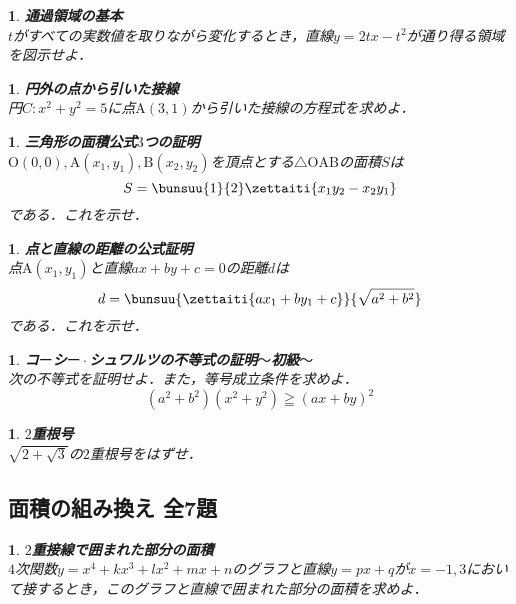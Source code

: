 \documentclass[10pt,
fleqn,
dvipdfmx,
uplatex
]{jsarticle}
\newtheorem{question}[Question]{}
\begin{document}
\begin{question}{\bf\boldmath 通過領域の基本}\\
$t$がすべての実数値を取りながら変化するとき，直線$y=2tx-t^2$が通り得る領域を図示せよ．
\end{question}



\begin{question}{\bf\boldmath 円外の点から引いた接線}\\
円$C:x^2+y^2=5$に点$\text{A}\left(3,1\right)$から引いた接線の方程式を求めよ．
\end{question}



\begin{question}{\bf\boldmath 三角形の面積公式$3$つの証明}\\
$\text{O}\left(0, 0\right), \text{A}\left(x_1, y_1\right), \text{B}\left(x_2, y_2\right)$を頂点とする$\triangle \text{OAB}$の面積$S$は
\[S=\bunsuu{1}{2}\zettaiti{x_1y_2-x_2y_1}\]
である．これを示せ．
\end{question}



\begin{question}{\bf\boldmath 点と直線の距離の公式証明}\\
点$\text{A}\left(x_1,y_1\right)$と直線$ax+by+c=0$の距離$d$は
\[d=\bunsuu{{\zettaiti{ax_1+by_1+c}}}{{\sqrt {a^2+b^2}}}\]
である．これを示せ．
\end{question}



\begin{question}{\bf\boldmath コ$ー$シ$ー\cdot$シュワルツの不等式の証明$〜$初級$〜$}\\
次の不等式を証明せよ．また，等号成立条件を求めよ．
\[\left(a^2+b^2\right)\left(x^2+y^2\right)\geqq \left(ax+by\right)^2\]
\end{question}



\begin{question}{\bf\boldmath $2$重根号}\\
$\sqrt {2+\sqrt 3}$の$2$重根号をはずせ．
\end{question}

\subsection{面積の組み換え 全7題}



\begin{question}{\bf\boldmath $2$重接線で囲まれた部分の面積}\\
$4$次関数$y=x^4+kx^3+lx^2+mx+n$のグラフと直線$y=px+q$が$x=-1,3$において接するとき，このグラフと直線で囲まれた部分の面積を求めよ．
\end{question}
\end{document}
